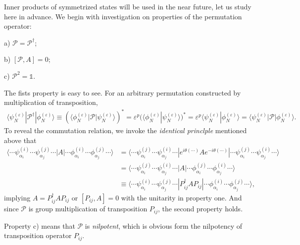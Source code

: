\documentclass[b5paper,10pt,UTF8]{book}
\numberwithin{equation}{section}
\begin{document}
 		\hfill\par
 		Inner products of symmetrized states will be used in the near future, let us study here in advance. We begin with investigation on properties of the permutation operator:
 		\begin{Property}\hfill\par
 			a) $\mathcal{P}=\mathcal{P}^\dagger$;\par
 			b) $[\mathcal{P},A]=0$;\par
 			c) $\mathcal{P}^2=\mathbb{1}$.
 		\end{Property}
 		\begin{Proof}
 			The fists property is easy to see. For an arbitrary permutation constructed by multiplication of transposition,
 			\begin{align*}
 				\langle\psi_N^{(\varepsilon)}|\mathcal{P}^\dagger|\phi_N^{(\varepsilon)}\rangle\equiv(\langle\phi_N^{(\varepsilon)}|\mathcal{P}|\psi_N^{(\varepsilon)}\rangle)^*=\varepsilon^p(\langle\phi_N^{(\varepsilon)}|\psi_N^{(\varepsilon)}\rangle)^*=\varepsilon^p\langle\psi_N^{(\varepsilon)}|\phi_N^{(\varepsilon)}\rangle=\langle\psi_N^{(\varepsilon)}|\mathcal{P}|\phi_N^{(\varepsilon)}\rangle.
 			\end{align*}
 			\indent To reveal the commutation relation, we invoke the \emph{identical princlple} mentioned above that
 			\begin{align*}
 				\langle\cdots\psi^{(i)}_{\alpha_i}\cdots\psi^{(j)}_{\alpha_j}\cdots|A|\cdots\phi^{(i)}_{\alpha_i}\cdots\phi^{(j)}_{\alpha_j}\cdots\rangle&=\langle\cdots\psi^{(j)}_{\alpha_i}\cdots\psi^{(i)}_{\alpha_j}\cdots|e^{i\theta(\cdots)}Ae^{-i\theta(\cdots)}|\cdots\psi^{(j)}_{\alpha_i}\cdots\psi^{(i)}_{\alpha_j}\cdots\rangle\\
 				&=\langle\cdots\psi^{(j)}_{\alpha_i}\cdots\psi^{(i)}_{\alpha_j}\cdots|A|\cdots\phi^{(j)}_{\alpha_i}\cdots\phi^{(i)}_{\alpha_j}\cdots\rangle\\
 				&\equiv\langle\cdots\psi^{(i)}_{\alpha_i}\cdots\psi^{(j)}_{\alpha_j}\cdots|P_{ij}^\dagger AP_{ij}|\cdots\phi^{(i)}_{\alpha_i}\cdots\phi^{(j)}_{\alpha_j}\cdots\rangle,
 			\end{align*}
 			implying $A=P_{ij}^\dagger AP_{ij}$ or $[P_{ij},A]=0$ with the unitarity in property one. And since $\mathcal{P}$ is group multiplication of transposition $P_{ij}$, the second property holds.\par
 			Property c) means that $\mathcal{P}$ is \emph{nilpotent}, which is obvious form the nilpotency of transposition operator $P_{ij}$.
 		\end{Proof}
\end{document}
